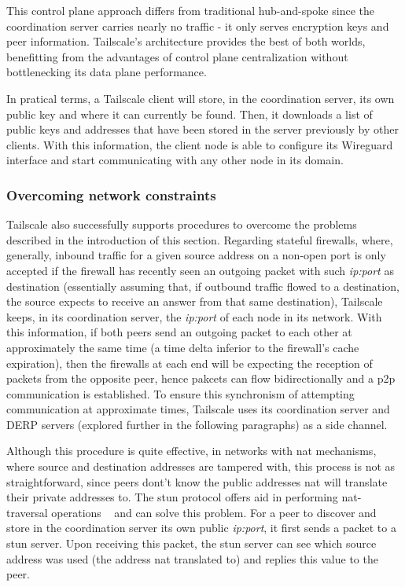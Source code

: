 \documentclass[11pt,twoside,a4paper]{report}
\begin{document}
This control plane approach differs from traditional hub-and-spoke since the coordination server carries nearly no traffic - it only serves encryption keys and peer information. Tailscale's architecture provides the best of both worlds, benefitting from the advantages of control plane centralization without bottlenecking its data plane performance.

In pratical terms, a Tailscale client will store, in the coordination server, its own public key and where it can currently be found. Then, it downloads a list of public keys and addresses that have been stored in the server previously by other clients. With this information, the client node is able to configure its Wireguard interface and start communicating with any other node in its domain.

\subsubsection{Overcoming network constraints}

Tailscale also successfully supports procedures to overcome the problems described in the introduction of this section. Regarding stateful firewalls, where, generally, inbound traffic for a given source address on a non-open port is only accepted if the firewall has recently seen an outgoing packet with such \emph{ip:port} as destination (essentially assuming that, if outbound traffic flowed to a destination, the source expects to receive an answer from that same destination), Tailscale keeps, in its coordination server, the \emph{ip:port} of each node in its network. With this information, if both peers send an outgoing packet to each other at approximately the same time (a time delta inferior to the firewall's cache expiration), then the firewalls at each end will be expecting the reception of packets from the opposite peer, hence pakcets can flow bidirectionally and a \ac{p2p} communication is established. To ensure this synchronism of attempting communication at approximate times, Tailscale uses its coordination server and \ac{DERP} servers (explored further in the following paragraphs) as a side channel.

Although this procedure is quite effective, in networks with \ac{nat} mechanisms, where source and destination addresses are tampered with, this process is not as straightforward, since peers dont't know the public addresses \ac{nat} will translate their private addresses to. The \ac{stun} protocol offers aid in performing \ac{nat}-traversal operations ~\cite{rfc8489} and can solve this problem. For a peer to discover and store in the coordination server its own public \emph{ip:port}, it first sends a packet to a \ac{stun} server. Upon receiving this packet, the \ac{stun} server can see which source address was used (the address \ac{nat} translated to) and replies this value to the peer.
\end{document}
